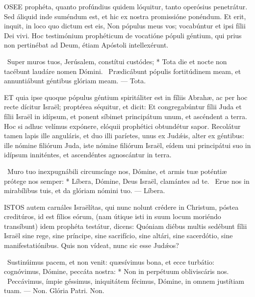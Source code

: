 


\lettrine[lines=2]{O}{SEE} prophéta, quanto profúndius quidem lóquitur, tanto operósius penetrátur. Sed áliquid inde suméndum est, et hic ex nostra promissióne ponéndum. Et erit, inquit, in loco quo dictum est eis, Non pópulus meus vos; vocabúntur et ipsi fílii Dei vivi. Hoc testimónium prophéticum de vocatióne pópuli géntium, qui prius non pertinébat ad Deum, étiam Apóstoli intellexérunt.

\R\ Super muros tuos, Jerúsalem, constítui custódes; * Tota die et nocte non tacébunt laudáre nomen Dómini. \V\ Prædicábunt pópulis fortitúdinem meam, et annuntiábunt géntibus glóriam meam. — Tota.


\lettrine[lines=2]{E}{T} quia ipse quoque pópulus géntium spiritáliter est in fíliis Abrahæ, ac per hoc recte dícitur Israël; proptérea séquitur, et dicit: Et congregabúntur fílii Juda et fílii Israël in idípsum, et ponent síbimet principátum unum, et ascéndent a terra. Hoc si adhuc velímus expónere, elóquii prophétici obtundétur sapor. Recolátur tamen lapis ille anguláris, et duo illi paríetes, unus ex Judǽis, alter ex géntibus: ille nómine filiórum Juda, iste nómine filiórum Israël, eídem uni principátui suo in idípsum inniténtes, et ascendéntes agnoscántur in terra.

\R\ Muro tuo inexpugnábili circumcínge nos, Dómine, et armis tuæ poténtiæ prótege nos semper: * Líbera, Dómine, Deus Israël, clamántes ad te. \V\ Erue nos in mirabílibus tuis, et da glóriam nómini tuo. — Líbera.


\lettrine[lines=2]{I}{STOS} autem carnáles Israëlítas, qui nunc nolunt crédere in Christum, póstea creditúros, id est fílios eórum, (nam útique isti in suum locum moriéndo transíbunt) idem prophéta testátur, dicens: Quóniam diébus multis sedébunt fílii Israël sine rege, sine príncipe, sine sacrifício, sine altári, sine sacerdótio, sine manifestatiónibus. Quis non vídeat, nunc sic esse Judǽos?

\R\ Sustinúimus pacem, et non venit: quæsívimus bona, et ecce turbátio: cognóvimus, Dómine, peccáta nostra: * Non in perpétuum obliviscáris nos. \V\ Peccávimus, ímpie géssimus, iniquitátem fécimus, Dómine, in omnem justítiam tuam. — Non. Glória Patri. Non.

